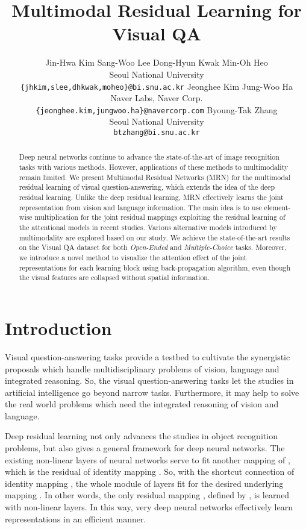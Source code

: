 \documentclass{article}
\title{Multimodal Residual Learning for Visual QA}
\author{Jin-Hwa Kim\hspace{1em}
Sang-Woo Lee\hspace{1em}
Dong-Hyun Kwak\hspace{1em}
Min-Oh Heo
\\Seoul National University\\\texttt{\{jhkim,slee,dhkwak,moheo\}@bi.snu.ac.kr}
\And
Jeonghee Kim\hspace{2em}
Jung-Woo Ha
\\Naver Labs, Naver Corp.\\\texttt{\{jeonghee.kim,jungwoo.ha\}@navercorp.com}
\And
Byoung-Tak Zhang\\Seoul National University\\\texttt{btzhang@bi.snu.ac.kr}}
\begin{document}
\maketitle

\begin{abstract}
  Deep neural networks continue to advance the state-of-the-art of image recognition tasks with various methods. However, applications of these methods to multimodality remain limited. We present Multimodal Residual Networks (MRN) for the multimodal residual learning of visual question-answering, which extends the idea of the deep residual learning. Unlike the deep residual learning, MRN effectively learns the joint representation from vision and language information. The main idea is to use element-wise multiplication for the joint residual mappings exploiting the residual learning of the attentional models in recent studies. Various alternative models introduced by multimodality are explored based on our study. We achieve the state-of-the-art results on the Visual QA dataset for both \textit{Open-Ended} and \textit{Multiple-Choice} tasks. Moreover, we introduce a novel method to visualize the attention effect of the joint representations for each learning block using back-propagation algorithm, even though the visual features are collapsed without spatial information.
\end{abstract}

\section{Introduction}


Visual question-answering tasks provide a testbed to cultivate the synergistic proposals which handle multidisciplinary problems of vision, language and integrated reasoning. So, the visual question-answering tasks let the studies in artificial intelligence go beyond narrow tasks. Furthermore, it may help to solve the real world problems which need the integrated reasoning of vision and language.

Deep residual learning \cite{He2015} not only advances the studies in object recognition problems, but also gives a general framework for deep neural networks. The existing non-linear layers of neural networks serve to fit another mapping of , which is the residual of identity mapping . So, with the shortcut connection of identity mapping , the whole module of layers fit  for the desired underlying mapping . In other words, the only residual mapping , defined by , is learned with non-linear layers. In this way, very deep neural networks effectively learn representations in an efficient manner. 
\end{document}
